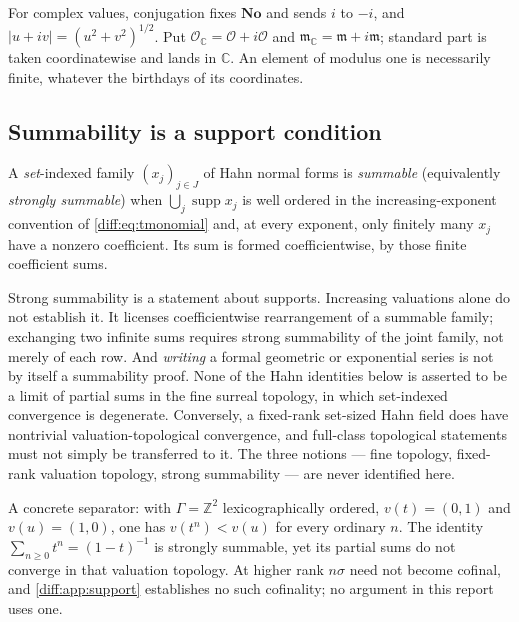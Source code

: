 \documentclass[11pt,letterpaper]{article}
\numberwithin{equation}{section}
\theoremstyle{definition}
\theoremstyle{remark}
\newcommand{\No}{\mathbf{No}}
\newcommand{\C}{\mathbb C}
\newcommand{\Z}{\mathbb Z}
\newcommand{\Ofin}{\mathcal O}
\newcommand{\mm}{\mathfrak m}
\newcommand{\supp}{\operatorname{supp}}
\newcommand{\abs}[1]{\lvert#1\rvert}
\begin{document}
For complex values, conjugation fixes $\No$ and sends $i$ to $-i$, and
$\abs{u+iv}=(u^{2}+v^{2})^{1/2}$. Put $\Ofin_{\C}=\Ofin+i\Ofin$ and
$\mm_{\C}=\mm+i\mm$; standard part is taken coordinatewise and lands in $\C$.
An element of modulus one is necessarily finite, whatever the birthdays of its
coordinates.

\subsection{Summability is a support condition}
\label{diff:sub:summability}

\begin{definition}
\label{diff:def:summable}
A \emph{set}-indexed family $(x_{j})_{j\in J}$ of Hahn normal forms is
\emph{summable} (equivalently \emph{strongly summable}) when
$\bigcup_{j}\supp x_{j}$ is well ordered in the increasing-exponent convention
of \cref{diff:eq:tmonomial} and, at every exponent, only finitely many $x_{j}$
have a nonzero coefficient. Its sum is formed coefficientwise, by those finite
coefficient sums.
\end{definition}

\begin{warning}
\label{diff:warn:summability}
Strong summability is a statement about supports. Increasing valuations alone
do not establish it. It licenses coefficientwise rearrangement of a summable
family; exchanging two infinite sums requires strong summability of the joint
family, not merely of each row. And \emph{writing} a formal geometric or
exponential series is not by itself a summability proof. None of the Hahn
identities below is asserted to be a limit of partial sums in the fine surreal
topology, in which set-indexed convergence is degenerate. Conversely, a
fixed-rank set-sized Hahn field does have nontrivial valuation-topological
convergence, and full-class topological statements must not simply be
transferred to it. The three notions --- fine topology, fixed-rank valuation
topology, strong summability --- are never identified here.

A concrete separator: with $\Gamma=\Z^{2}$ lexicographically ordered,
$v(t)=(0,1)$ and $v(u)=(1,0)$, one has $v(t^{n})<v(u)$ for every ordinary $n$.
The identity $\sum_{n\geq0}t^{n}=(1-t)^{-1}$ is strongly summable, yet its
partial sums do not converge in that valuation topology. At higher rank
$n\sigma$ need not become cofinal, and \cref{diff:app:support} establishes no
such cofinality; no argument in this report uses one.
\end{warning}
\end{document}
